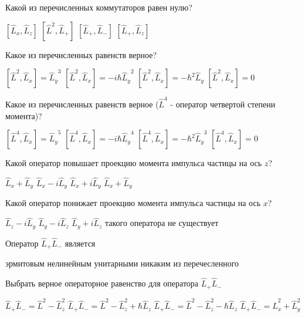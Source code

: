 \documentclass[11pt,a4paper]{exam}
\begin{document}
\begin{questions}
\question Какой из перечисленных коммутаторов равен нулю?
\begin{choices}
\choice $\left[ {{{\hat L}_x},{{\hat L}_z}} \right]$    
\choice $\left[ {{{\hat L}^2},{{\hat L}_ + }} \right]$     
\choice $\left[ {{{\hat L}_ + },{{\hat L}_ - }} \right]$      
\choice $\left[ {{{\hat L}_ + },{{\hat L}_z}} \right]$
\end{choices}

\question Какое из перечисленных равенств верное?
\begin{choices}
\choice $\left[ {{{\hat L}^2},{{\hat L}_x}} \right] = {\hat L_y}^3$ 
\choice $\left[ {{{\hat L}^2},{{\hat L}_x}} \right] =  - i\hbar {\hat L_y}^2$   
\choice $\left[ {{{\hat L}^2},{{\hat L}_x}} \right] =  - {\hbar ^2}{\hat L_y}$  
\choice $\left[ {{{\hat L}^2},{{\hat L}_x}} \right] = 0$
\end{choices}

\question Какое из перечисленных равенств верное (${\hat L^4}$ - оператор четвертой степени момента)?
\begin{choices}
\choice $\left[ {{{\hat L}^4},{{\hat L}_x}} \right] = {\hat L_y}^5$ 
\choice $\left[ {{{\hat L}^4},{{\hat L}_x}} \right] =  - i\hbar {\hat L_y}^4$      
\choice $\left[ {{{\hat L}^4},{{\hat L}_x}} \right] =  - {\hbar ^2}{\hat L_y}^3$      
\choice $\left[ {{{\hat L}^4},{{\hat L}_x}} \right] = 0$
\end{choices}

\question Какой оператор повышает проекцию момента импульса частицы на ось $z$?
\begin{choices}
\choice ${\hat L_x} + {\hat L_y}$  
\choice ${\hat L_x} - i{\hat L_y}$ 
\choice ${\hat L_x} + i{\hat L_y}$ 
\choice ${\hat L_x} + {\hat L_y}$
\end{choices}

\question Какой оператор понижает проекцию момента импульса частицы на ось $x$?
\begin{choices}
\choice ${\hat L_z} - i{\hat L_y}$ 
\choice ${\hat L_y} - i{\hat L_z}$ 
\choice ${\hat L_y} + i{\hat L_z}$ 
\choice такого оператора не существует
\end{choices}

\question Оператор ${\hat L_ + }{\hat L_ - }$ является
\begin{choices}
\choice эрмитовым   
\choice нелинейным  
\choice унитарными  
\choice никаким из перечесленного
\end{choices}

\question Выбрать верное операторное равенство для оператора ${\hat L_ + }{\hat L_ - }$
\begin{choices}
\choice ${\hat L_ + }{\hat L_ - } = {\hat L^2} - \hat L_z^2$  
\choice ${\hat L_ + }{\hat L_ - } = {\hat L^2} - \hat L_z^2 + \hbar {\hat L_z}$ 
\choice ${\hat L_ + }{\hat L_ - } = {\hat L^2} - \hat L_z^2 - \hbar {\hat L_z}$ 
\choice ${\hat L_ + }{\hat L_ - } = \hat L_x^2 + \hat L_y^2$
\end{choices}


\end{questions}
\end{document}
